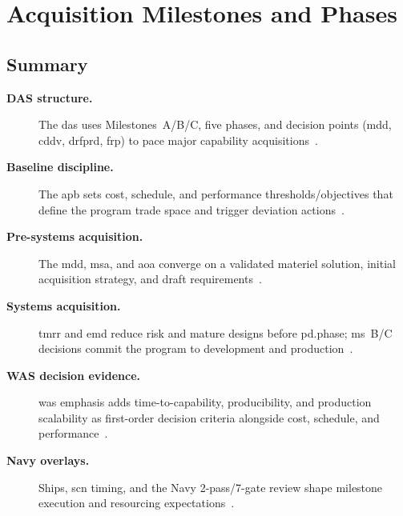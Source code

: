 \documentclass[../main.tex]{subfiles}
\begin{document}
\section{Acquisition Milestones and Phases}

\subsection{Summary}
\begin{description}
  \item[\textbf{DAS structure.}] The \ac{das} uses Milestones~A/B/C, five phases, and decision points (\ac{mdd}, \ac{cddv}, \ac{drfprd}, \ac{frp}) to pace major capability acquisitions~\autocite{DoDD5000-01,DoDI5000-02,DoDI5000-85,edo-3-3-2-acq-milestones-phases-2025}.
  \item[\textbf{Baseline discipline.}] The \ac{apb} sets cost, schedule, and performance thresholds/objectives that define the program trade space and trigger deviation actions~\autocite{DoDI5000-85,edo-3-3-2-acq-milestones-phases-2025}.
  \item[\textbf{Pre-systems acquisition.}] The \ac{mdd}, \ac{msa}, and \ac{aoa} converge on a validated materiel solution, initial acquisition strategy, and draft requirements~\autocite{DoDI5000-85,USC-10-4251,edo-3-3-2-acq-milestones-phases-2025}.
  \item[\textbf{Systems acquisition.}] \ac{tmrr} and \ac{emd} reduce risk and mature designs before \ac{pd.phase}; \ac{ms}~B/C decisions commit the program to development and production~\autocite{DoDI5000-85,edo-3-3-2-acq-milestones-phases-2025}.
  \item[\textbf{WAS decision evidence.}] \ac{was} emphasis adds time-to-capability, producibility, and production scalability as first-order decision criteria alongside cost, schedule, and performance~\autocite{secwar-was-memo-2025,secwar-acq-transformation-2025}.
  \item[\textbf{Navy overlays.}] Ships, \ac{scn} timing, and the Navy 2-pass/7-gate review shape milestone execution and resourcing expectations~\autocite{SECNAV5000-2G,edo-3-3-2-acq-milestones-phases-2025}.
\end{description}
\end{document}
